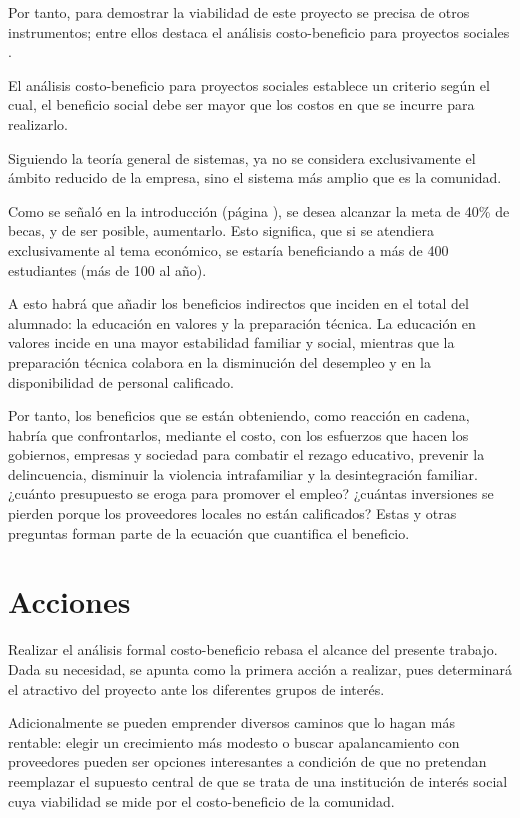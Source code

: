 Por tanto, para demostrar la viabilidad de este proyecto se precisa de otros instrumentos; entre ellos destaca el análisis costo-beneficio para proyectos sociales \citep{Conant2004}.

El análisis costo-beneficio para proyectos sociales establece un criterio según el cual, el beneficio social debe ser mayor que los costos en que se incurre para realizarlo.

Siguiendo la teoría general de sistemas, ya no se considera exclusivamente el ámbito reducido de la empresa, sino el sistema más amplio que es la comunidad.

Como se señaló en la introducción (página \pageref{sub:sub:Beneficio:Social}), se desea alcanzar la meta de 40\% de becas, y de ser posible, aumentarlo. Esto significa, que si se atendiera exclusivamente al tema económico, se estaría beneficiando a más de 400 estudiantes (más de 100 al año).

A esto habrá que añadir los beneficios indirectos que inciden en el total del alumnado: la educación en valores y la preparación técnica. La educación en valores incide en una mayor estabilidad familiar y social, mientras que la preparación técnica colabora en la disminución del desempleo y en la disponibilidad de personal calificado.

Por tanto, los beneficios que se están obteniendo, como reacción en cadena, habría que confrontarlos, mediante el costo, con los esfuerzos que hacen los gobiernos, empresas y sociedad para combatir el rezago educativo, prevenir la delincuencia, disminuir la violencia intrafamiliar y la desintegración familiar. ¿cuánto presupuesto se eroga para promover el empleo? ¿cuántas inversiones se pierden porque los proveedores locales no están calificados? Estas y otras preguntas forman parte de la ecuación que cuantifica el beneficio.

\section*{Acciones}

Realizar el análisis formal costo-beneficio rebasa el alcance del presente trabajo. Dada su necesidad, se apunta como la primera acción a realizar, pues determinará el atractivo del proyecto ante los diferentes grupos de interés.

Adicionalmente se pueden emprender diversos caminos que lo hagan más rentable: elegir un crecimiento más modesto o buscar apalancamiento con proveedores pueden ser opciones interesantes a condición de que no pretendan reemplazar el supuesto central de que se trata de una institución de interés social cuya viabilidad se mide por el costo-beneficio de la comunidad.

